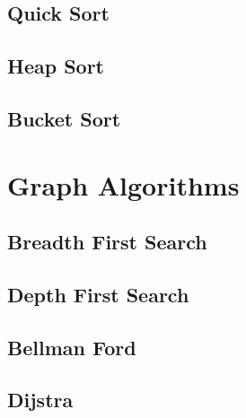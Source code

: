 \documentclass[10pt,a4paper]{article}
\begin{document}
\begin{landscape}
\begin{multicols}{2}


\subsection{Quick Sort}



\subsection{Heap Sort}



\subsection{Bucket Sort}



\section{Graph Algorithms}

\subsection{Breadth First Search}



\subsection{Depth First Search}



\subsection{Bellman Ford}



\subsection{Dijstra}




\end{multicols}
\end{landscape}
\end{document}

